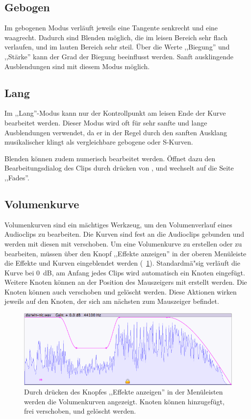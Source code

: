\subsection{Gebogen}
Im gebogenen Modus verläuft jeweils eine Tangente senkrecht und eine waagrecht. Dadurch sind Blenden möglich, die im leisen Bereich sehr flach verlaufen, und im lauten Bereich sehr steil. Über die Werte ,,Biegung'' und ,,Stärke'' kann der Grad der Biegung beeinflusst werden. Sanft ausklingende Ausblendungen sind mit diesem Modus möglich.

\subsection{Lang}
Im ,,Lang''-Modus kann nur der Kontrollpunkt am leisen Ende der Kurve bearbeitet werden. Dieser Modus wird oft für sehr sanfte und lange Ausblendungen verwendet, da er in der Regel durch den sanften Ausklang musikalischer klingt als vergleichbare gebogene oder S-Kurven.

Blenden können zudem numerisch bearbeitet werden. Öffnet dazu den Bearbeitungsdialog des Clips durch drücken von , und wechselt auf die Seite ,,Fades''.

\subsection{Volumenkurve}
Volumenkurven sind ein mächtiges Werkzeug, um den Volumenverlauf eines Audioclips zu bearbeiten. Die Kurven sind fest an die Audioclips gebunden und werden mit diesen mit verschoben. Um eine Volumenkurve zu erstellen oder zu bearbeiten, müssen über den Knopf ,,Effekte anzeigen'' in der oberen Menüleiste die Effekte und Kurven eingeblendet werden (\FigB~\ref{fig_gcurve01}). Standardmä"sig verläuft die Kurve bei 0~dB, am Anfang jedes Clips wird automatisch ein Knoten eingefügt. Weitere Knoten können an der Position des Mauszeigers mit  erstellt werden. Die Knoten können auch verschoben  und gelöscht  werden. Diese Aktionen wirken jeweils auf den Knoten, der sich am nächsten zum Mauszeiger befindet.

\begin{figure}[t]
 \centering\includegraphics[width=\textwidth]{images/gcurve01}
 \caption{Durch drücken des Knopfes ,,Effekte anzeigen'' in der Menüleisten werden die Volumenkurven angezeigt. Knoten können hinzugefügt, frei verschoben, und gelöscht werden.}
 \label{fig_gcurve01}
\end{figure}

